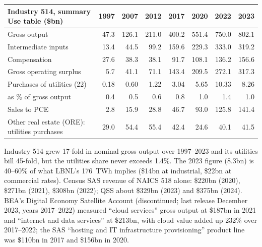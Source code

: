 \documentclass[11pt]{article}
\begin{document}
\begin{center}\footnotesize
\begin{tabular}{lrrrrrrr}
\toprule
Industry 514, summary Use table (\$bn) & 1997 & 2007 & 2012 & 2017 & 2020 & 2022 & 2023 \\
\midrule
Gross output & 47.3 & 126.1 & 211.0 & 400.2 & 551.4 & 750.0 & 802.1 \\
Intermediate inputs & 13.4 & 44.5 & 99.2 & 159.6 & 229.3 & 333.0 & 319.2 \\
Compensation & 27.6 & 38.3 & 38.1 & 91.7 & 108.1 & 136.2 & 156.6 \\
Gross operating surplus & 5.7 & 41.1 & 71.1 & 143.4 & 209.5 & 272.1 & 317.3 \\
Purchases of utilities (22) & 0.18 & 0.60 & 1.22 & 3.04 & 5.65 & 10.33 & 8.26 \\
\quad as \% of gross output & 0.4 & 0.5 & 0.6 & 0.8 & 1.0 & 1.4 & 1.0 \\
Sales to PCE & 2.8 & 15.9 & 28.8 & 46.7 & 93.0 & 125.8 & 141.4 \\
\midrule
Other real estate (ORE): utilities purchases & 29.0 & 54.4 & 55.4 & 42.4 & 24.6 & 40.1 & 41.5 \\
\bottomrule
\end{tabular}
\end{center}
Industry 514 grew 17-fold in nominal gross output over 1997--2023 and its utilities bill 45-fold, but the utilities share never exceeds 1.4\%. The 2023 figure (8.3bn) is 40--60\% of what LBNL's 176~TWh implies (\$14bn at industrial, \$22bn at commercial rates). Census SAS revenue of NAICS 518 alone: \$220bn (2020), \$271bn (2021), \$308bn (2022); QSS about \$329bn (2023) and \$375bn (2024). BEA's Digital Economy Satellite Account (discontinued; last release December 2023, years 2017--2022) measured ``cloud services'' gross output at \$187bn in 2021 and ``internet and data services'' at \$213bn, with cloud value added up 232\% over 2017--2022; the SAS ``hosting and IT infrastructure provisioning'' product line was \$110bn in 2017 and \$156bn in 2020.
\end{document}
